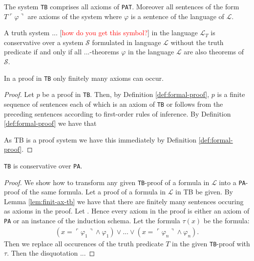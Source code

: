 \begin{definition}[\texttt{TB}]
    \label{def:TB}
    The system \texttt{TB} comprises all axioms of \texttt{PAT}. Moreover all sentences of the form $T\ulcorner\varphi\urcorner$ are axioms of the system where $\varphi$ is a sentence of the language of $\mathcal{L}$.
\end{definition}

\begin{definition}[conservativity]
    \label{def:cons}
    A truth system $...$ [\textcolor{red}{how do you get this symbol?}] in the language $\mathcal{L}_T$ is conservative over a system $\mathcal{S}$ formulated in language $\mathcal{L}$ without the truth predicate if and only if all $...$-theorems $\varphi$ in the language $\mathcal{L}$ are also theorems of $\mathcal{S}$.
\end{definition}

\begin{lemma}
    \label{lem:finit-ax-tb}
    In a proof in \texttt{TB} only finitely many axioms can occur.
\end{lemma}

\begin{proof}
    Let $p$ be a proof in \texttt{TB}. Then, by Definition \ref{def:formal-proof}, $p$ is a finite sequence of sentences each of which is an axiom of \texttt{TB} or follows from the preceding sentences according to first-order rules of inference. 
    By Definition \ref{def:formal-proof} we have that 
    
    As TB is a proof system we have this immediately by Definition \ref{def:formal-proof}.
\end{proof}

\begin{theorem}
    \label{thm:tb-cons}
    \texttt{TB} is conservative over \texttt{PA}.
\end{theorem}

\begin{proof}   We show how to transform any given \texttt{TB}-proof of a formula in $\mathcal{L}$ into a \texttt{PA}-proof of the same formula. Let a proof of a formula in $\mathcal{L}$ in TB be given. By Lemma \ref{lem:finit-ax-tb} we have that there are finitely many sentences occuring as axioms in the proof. Let  . Hence every axiom in the proof is either an axiom of \texttt{PA} or an instance of the induction schema. Let the formula $\tau(x)$ be the formula: 
\begin{align*}
    (x = \ulcorner \varphi_1 \urcorner \land \varphi_1) \lor ... \lor (x = \ulcorner \varphi_n \urcorner \land \varphi_n).
\end{align*}
Then we replace all occurences of the truth predicate $T$ in the given \texttt{TB}-proof with $\tau$. Then the disquotation ...
\end{proof}
